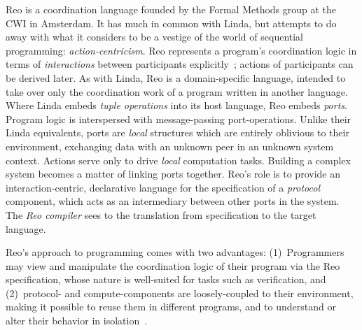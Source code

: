 Reo is a coordination language founded by the Formal Methods group at the CWI in Amsterdam. It has much in common with Linda, but attempts to do away with what it considers to be a vestige of the world of sequential programming: \textit{action-centricism}. Reo represents a program's coordination logic in terms of \textit{interactions} between participants explicitly~\cite{arbab2011puff}; actions of participants can be derived later. As with Linda, Reo is a domain-specific language, intended to take over only the coordination work of a program written in another language. Where Linda embeds \textit{tuple operations} into its host language, Reo embeds \textit{ports}. Program logic is interspersed with message-passing port-operations. Unlike their Linda equivalents, ports are \textit{local} structures which are entirely oblivious to their environment, exchanging data with an unknown peer in an unknown system context. Actions serve only to drive \textit{local} computation tasks. Building a complex system becomes a matter of linking ports together. Reo's role is to provide an interaction-centric, declarative language for the specification of a \textit{protocol} component, which acts as an intermediary between other ports in the system. The \textit{Reo compiler} sees to the translation from specification to the target language.

Reo's approach to programming comes with two advantages: (1)~Programmers may view and manipulate the coordination logic of their program via the Reo specification, whose nature is well-suited for tasks such as verification, and (2)~protocol- and compute-components are loosely-coupled to their environment, making it possible to reuse them in different programs, and to understand or alter their behavior in isolation~\cite{arbab2011puff}.

%


